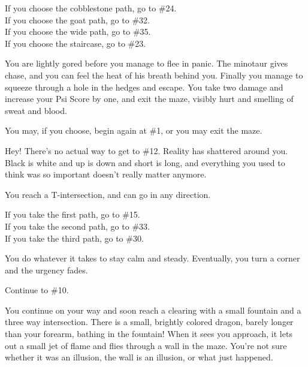 \documentclass[green]{gl2018}
\begin{document}
\begin{large}
\begin{location}{10}
\begin{fromhere}
If you choose the cobblestone path, go to \#24.\\
  If you choose the goat path, go to \#32.\\
  If you choose the wide path, go to \#35.\\
  If you choose the staircase, go to \#23.
\end{fromhere}
\end{location}
\begin{location}{11}
You are lightly gored before you manage to flee in panic.  The minotaur gives chase, and you can feel the heat of his breath behind you.  Finally you manage to squeeze through a hole in the hedges and escape.  You take two damage and increase your Psi Score by one, and exit the maze, visibly hurt and smelling of sweat and blood.  
\begin{fromhere}
You may, if you choose, begin again at \#1, or you may exit the maze.
\end{fromhere}
\end{location}
\begin{location}{12}
Hey!  There's no actual way to get to \#12.  Reality has shattered around you.  Black is white and up is down and short is long, and everything you used to think was so important doesn't really matter anymore.  
\end{location}
\begin{location}{13}
You reach a T-intersection, and can go in any direction.
\begin{fromhere}
  If you take the first path, go to \#15.\\
 If you take the second path, go to \#33.\\
 If you take the third path, go to \#30.
\end{fromhere}
\end{location}
\begin{location}{14}
You do whatever it takes to stay calm and steady.  Eventually, you turn a corner and the urgency fades. 
\begin{fromhere}Continue to \#10.\end{fromhere}\end{location}
\begin{location}{15}
You continue on your way and soon reach a clearing with a small fountain and a three way intersection.  There is a small, brightly colored dragon, barely longer than your forearm, bathing in the fountain!  When it sees you approach, it lets out a small jet of flame and flies through a wall in the maze.  You're not sure whether it was an illusion, the wall is an illusion, or what just happened.


\end{location}
\end{large}
\end{document}
